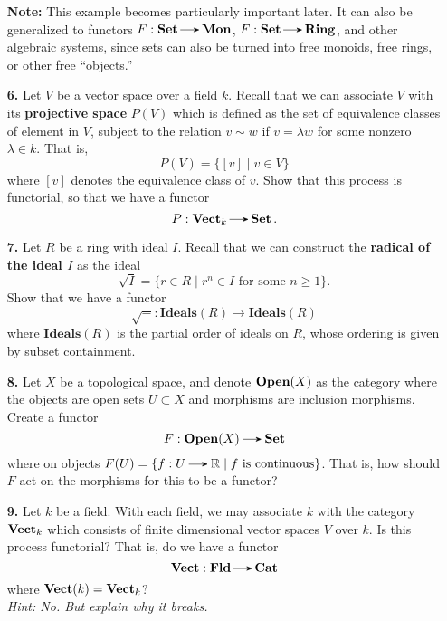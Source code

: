 \begin{itemize}
\begin{itemize}
            
        \end{itemize} 

        \textbf{Note:} This example becomes particularly important later. 
        It can also be generalized to functors $F:  \Set \to \mon$, 
        $F: \Set \to \ring$, and other algebraic systems, 
        since sets can also be turned into free monoids, free rings, or other 
        free ``objects.''
        \vspace{0.2cm}

        \item[\textbf{6.}]
        Let $V$ be a vector space over a field $k$. 
        Recall that we can associate $V$ with its 
        \textbf{projective space} $P(V)$ which is defined as the set of equivalence 
        classes of element in $V$, subject to the relation $v \sim w$ if $v = \lambda w$ 
        for some nonzero $\lambda \in k$. That is,
        \[
            P(V) =  \Big\{[v] \mid v \in V \Big\}
        \]
        where $[v]$ denotes the equivalence class of $v$. Show that this process 
        is functorial, so that we have a functor 
        \[
            P: \vect_k \to \Set.
        \]

        \item[\textbf{7.}]
        Let $R$ be a ring with ideal $I$. Recall that we can construct the 
        \textbf{radical of the ideal $I$} as the ideal 
        \[
            \sqrt{I} = \{r \in R \mid r^n \in I \text{ for some } n \ge 1  \}.
        \]
        Show that we have a functor 
        \[
            \sqrt{-}: \textbf{Ideals}(R) \to \textbf{Ideals}(R)    
        \]
        where $\textbf{Ideals}(R)$ is the partial order of ideals on $R$, 
        whose ordering is given by subset containment. 
    
        \item[\textbf{8.}] 
        Let $X$ be a topological space, and denote $\operatorname{\mathbf{Open}}(X)$ as the category 
        where the objects are open sets $U \subset X$ and morphisms are inclusion morphisms. 
        Create a functor 
        \[
            F: \open(X) \to \Set  
        \]
        where on objects $F(U) = \{f: U \to \rr \mid f \text{ is continuous}\}$. That is, how 
        should $F$ act on the morphisms for this to be a functor?

        \item[\textbf{9.}] 
        Let $k$ be a field. With each field, we may associate $k$ with the category 
        $\operatorname{\mathbf{Vect}}_k$ which consists of finite dimensional vector spaces $V$ 
        over $k$. Is this process functorial? That is, do we have a functor 
        \[
            \vect: \fld \to \cat 
        \]
        where $\operatorname{\mathbf{Vect}}(k) = \operatorname{\mathbf{Vect}}_k$?\\
        \emph{Hint: No. But explain why it breaks.}
    \end{itemize}


